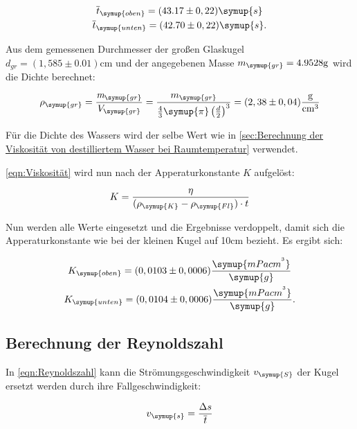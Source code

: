 \begin{gather}
  \overline{t}_{\symup{oben}} = (43.17\pm0,22) \symup{s} \notag \\
  \overline{t}_{\symup{unten}} = (42.70\pm0,22) \symup{s}  \notag .
\end{gather}

Aus dem gemessenen Durchmesser der großen Glaskugel $d_{gr}=(1,585\pm0.01) \unit{\centi\metre}$ und der angegebenen Masse
$m_{\symup{gr}}=4.9528\unit{\gram}$ wird die Dichte berechnet:

\begin{equation}
  \rho_{\symup{gr}}=\frac{\emph{m}_{\symup{gr}}}{V_{\symup{gr}}}=%
  \frac{m_{\symup{gr}}}{\frac{4}{3}\symup{\pi}\left(\frac{d}{2}\right)^3}=(2,38\pm0,04) \unit{\gram\per\cubic\centi\metre}
\end{equation}

Für die Dichte des Wassers wird der selbe Wert wie in \autoref{sec:Berechnung der Viskosität von destilliertem Wasser bei Raumtemperatur}
verwendet.

\autoref{eqn:Viskosität} wird nun nach der Apperaturkonstante $K$ aufgelöst:

\begin{equation}
  K=\frac{\eta}{(\rho_{\symup{K}}-\rho_{\symup{Fl}})\cdot t}
\end{equation}

Nun werden alle Werte eingesetzt und die Ergebnisse verdoppelt, damit sich die Apperaturkonstante wie bei der kleinen
Kugel auf 10cm bezieht. Es ergibt sich:

\begin{gather}
  K_{\symup{oben}} = (0,0103\pm0,0006) \frac{\symup{mPacm^{^{3}}}}{\symup{g}}  \notag \\
  K_{\symup{unten}} = (0,0104\pm0,0006) \frac{\symup{mPacm^{^{3}}}}{\symup{g}}  \notag .
\end{gather}

\subsection{Berechnung der Reynoldszahl}
\label{sec:Berechnung der Reynoldszahl}

In \autoref{eqn:Reynoldszahl} kann die Strömungsgeschwindigkeit $v_{\symup{S}}$ der  Kugel ersetzt werden durch
ihre Fallgeschwindigkeit:

\begin{equation}
  v_{\symup{s}}=\frac{\Delta s}{\overline{t}}
\end{equation}

